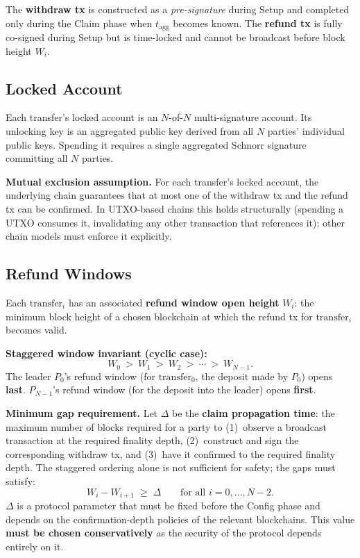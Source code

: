 \documentclass[11pt,a4paper,dvipsnames]{article}
\newcommand{\tagg}{t_{\mathrm{agg}}}
\begin{document}
\noindent
The \textbf{withdraw tx} is constructed as a \emph{pre-signature} during Setup
and completed only during the Claim phase when $\tagg$ becomes known.
The \textbf{refund tx} is fully co-signed during Setup but is time-locked
and cannot be broadcast before block height $W_i$.

\subsection{Locked Account}

Each transfer's locked account is an $N$-of-$N$ multi-signature account.
Its unlocking key is an aggregated public key derived from all $N$ parties'
individual public keys. Spending it requires a single aggregated Schnorr
signature committing all $N$ parties.

\medskip\noindent\textbf{Mutual exclusion assumption.}\;
For each transfer's locked account, the underlying chain guarantees that at
most one of the withdraw tx and the refund tx can be confirmed.
In UTXO-based chains this holds structurally (spending a UTXO consumes it,
invalidating any other transaction that references it); other chain models
must enforce it explicitly.

\subsection{Refund Windows}
\label{sec:windows}

Each $\mathrm{transfer}_i$ has an associated \textbf{refund window open height}
$W_i$: the minimum block height of a chosen blockchain at which the refund tx for
$\mathrm{transfer}_i$ becomes valid.

\medskip
\noindent\textbf{Staggered window invariant (cyclic case):}
\[
  W_0\ >\ W_1\ >\ W_2\ >\ \cdots\ >\ W_{N-1}.
\]
The leader $P_0$'s refund window (for $\mathrm{transfer}_0$, the deposit made
by $P_0$) opens \textbf{last}.
$P_{N-1}$'s refund window (for the deposit into the leader) opens \textbf{first}.

\medskip
\noindent\textbf{Minimum gap requirement.}\;
Let $\Delta$ be the \textbf{claim propagation time}: the maximum number of
blocks required for a party to (1)~observe a broadcast transaction at the
required finality depth, (2)~construct and sign the corresponding withdraw
tx, and (3)~have it confirmed to the required finality depth.
The staggered ordering alone is not sufficient for safety; the gaps must
satisfy:
\[
  W_i - W_{i+1} \;\geq\; \Delta \qquad \text{for all } i = 0, \ldots, N-2.
\]
$\Delta$ is a protocol parameter that must be fixed before the Config phase
and depends on the confirmation-depth policies of the relevant blockchains.
This value \textbf{must be chosen conservatively} as the security of the protocol depends 
entirely on it.
\end{document}
